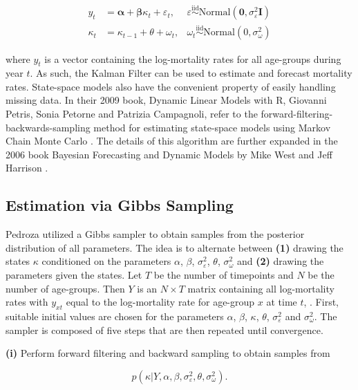 \documentclass[
]{book}
\begin{document}
\[
\begin{aligned}
y_t &= \mathbf\alpha + \mathbf\beta\kappa_t + \varepsilon_t, 
& \varepsilon \overset{\mathrm{iid}}{\sim} \mathrm{Normal} (\mathbf 0, \sigma^2_\varepsilon\mathbf I) \\
\kappa_t &= \kappa_{t - 1} + \theta + \omega_t, 
& \omega_t \overset{\mathrm{iid}}{\sim} \mathrm{Normal}(0, \sigma^2_\omega)
\end{aligned}
\]

where \(y_t\) is a vector containing the log-mortality rates for all age-groups during year \(t\). As such, the Kalman Filter can be used to estimate and forecast mortality rates. State-space models also have the convenient property of easily handling missing data. In their 2009 book, Dynamic Linear Models with R, Giovanni Petris, Sonia Petorne and Patrizia Campagnoli, refer to the forward-filtering-backwards-sampling method for estimating state-space models using Markov Chain Monte Carlo \citep{campagnoli2009dynamic}. The details of this algorithm are further expanded in the 2006 book Bayesian Forecasting and Dynamic Models by Mike West and Jeff Harrison \citep{west2006bayesian}.

\hypertarget{estimation-via-gibbs-sampling}{%
\subsection{Estimation via Gibbs Sampling}\label{estimation-via-gibbs-sampling}}

Pedroza utilized a Gibbs sampler to obtain samples from the posterior distribution of all parameters. The idea is to alternate between \textbf{(1)} drawing the states \(\kappa\) conditioned on the parameters \(\alpha\), \(\beta\), \(\sigma^2_\varepsilon\), \(\theta\), \(\sigma^2_\omega\) and \textbf{(2)} drawing the parameters given the states. Let \(T\) be the number of timepoints and \(N\) be the number of age-groups. Then \(Y\) is an \(N \times T\) matrix containing all log-mortality rates with \(y_{xt}\) equal to the log-mortality rate for age-group \(x\) at time \(t\), . First, suitable initial values are chosen for the parameters \(\alpha\), \(\beta\), \(\kappa\), \(\theta\), \(\sigma^2_\varepsilon\) and \(\sigma^2_\omega\). The sampler is composed of five steps that are then repeated until convergence.

\textbf{(i)} Perform forward filtering and backward sampling to obtain samples from

\[
p(\kappa | Y, \alpha, \beta, \sigma^2_\varepsilon, \theta, \sigma^2_\omega).
\]
\end{document}

